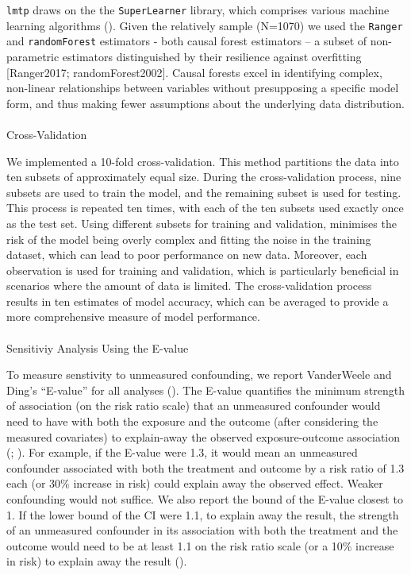 \documentclass[
  singlecolumn]{article}
\makeatletter
\let\oldparagraph\paragraph
\renewcommand{\paragraph}{
    \@ifstar
      \xxxParagraphStar
      \xxxParagraphNoStar
  }
\newcommand{\xxxParagraphStar}[1]{\oldparagraph*{#1}\mbox{}}
\newcommand{\xxxParagraphNoStar}[1]{\oldparagraph{#1}\mbox{}}
\makeatother
\begin{document}
\texttt{lmtp} draws on the the \texttt{SuperLearner} library, which
comprises various machine learning algorithms
(). Given the
relatively sample (N=1070) we used the \texttt{Ranger} and
\texttt{randomForest} estimators - both causal forest estimators -- a
subset of non-parametric estimators distinguished by their resilience
against overfitting {[}Ranger2017; randomForest2002{]}. Causal forests
excel in identifying complex, non-linear relationships between variables
without presupposing a specific model form, and thus making fewer
assumptions about the underlying data distribution.

\paragraph{Cross-Validation}\label{cross-validation}

We implemented a 10-fold cross-validation. This method partitions the
data into ten subsets of approximately equal size. During the
cross-validation process, nine subsets are used to train the model, and
the remaining subset is used for testing. This process is repeated ten
times, with each of the ten subsets used exactly once as the test set.
Using different subsets for training and validation, minimises the risk
of the model being overly complex and fitting the noise in the training
dataset, which can lead to poor performance on new data. Moreover, each
observation is used for training and validation, which is particularly
beneficial in scenarios where the amount of data is limited. The
cross-validation process results in ten estimates of model accuracy,
which can be averaged to provide a more comprehensive measure of model
performance.

\paragraph{Sensitiviy Analysis Using the
E-value}\label{sensitiviy-analysis-using-the-e-value}

To measure senstivity to unmeasured confounding, we report VanderWeele
and Ding's ``E-value'' for all analyses
(). The E-value
quantifies the minimum strength of association (on the risk ratio scale)
that an unmeasured confounder would need to have with both the exposure
and the outcome (after considering the measured covariates) to
explain-away the observed exposure-outcome association
(;
). For
example, if the E-value were 1.3, it would mean an unmeasured confounder
associated with both the treatment and outcome by a risk ratio of 1.3
each (or 30\% increase in risk) could explain away the observed effect.
Weaker confounding would not suffice. We also report the bound of the
E-value closest to 1. If the lower bound of the CI were 1.1, to explain
away the result, the strength of an unmeasured confounder in its
association with both the treatment and the outcome would need to be at
least 1.1 on the risk ratio scale (or a 10\% increase in risk) to
explain away the result ().
\end{document}
